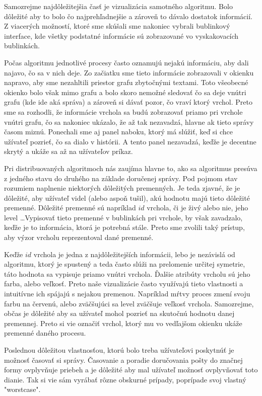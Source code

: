 Samozrejme najdôležitejšia časť je vizualizácia samotného algoritmu. Bolo dôležité aby to bolo čo
najprehľadnejšie a zároveň to dávalo dostatok informácií. Z viacerých možností, ktoré sme skúšali
sme nakoniec vybrali bublinkový interface, kde všetky podstatné informácie sú zobrazované vo
vyskakovacích bublinkách.

Počas algoritmu jednotlivé procesy často oznamujú nejakú informáciu, aby dali najavo, čo sa v nich
deje. Zo začiatku sme tieto informácie zobrazovali v okienku napravo, aby sme nezahltili priestor
grafu zbytočnými textami. Toto všeobecné okienko bolo však mimo grafu a bolo skoro nemožné sledovať
čo sa deje vnútri grafu (kde ide aká správa) a zároveň si dávať pozor, čo vraví ktorý vrchol. Preto
sme sa rozhodli, že informácie vrchola sa budú zobrazovať priamo pri vrchole vnútri grafu, čo sa
nakoniec ukázalo, že až tak nezavadzá, hlavne ak tieto správy časom miznú. Ponechali sme aj
panel naboku, ktorý má slúžiť, keď si chce užívateľ pozrieť, čo sa dialo v histórii. A tento panel
nezavadzá, keďže je decentne skrytý a ukáže sa až na užívateľov príkaz.

Pri distribuovaných algoritmoch nás zaujíma hlavne to, ako sa algoritmus presúva z jedného stavu do
druhého na základe doručenej správy. Pod pojmom stav rozumiem naplnenie niektorých dôležitých
premenných. Je teda zjavné, že je dôležité, aby užívateľ videl (alebo aspoň tušil), akú hodnotu majú
tieto dôležité premenné. Dôležité premenné sú napríklad $id$ vrchola, či je živý alebo nie, jeho
level \dots Vypisovať tieto premenné v bublinkách pri vrchole, by však zavadzalo, keďže je to
informácia, ktorá je potrebná stále. Preto sme zvolili taký prístup, aby výzor vrcholu reprezentoval
dané premenné.

Keďže $id$ vrchola je jedna z najdôležitejších informácii, lebo je nezávislá od algoritmu, ktorý je
spustený a teda často slúži na prelomenie určitej symetrie, táto hodnota sa vypisuje priamo vnútri
vrchola. Ďalšie atribúty vrcholu sú jeho farba, alebo veľkosť. Preto naše vizualizácie často
využívajú tieto vlastnosti a intuitívne ich spájajú s nejakou premenou. Napríklad mŕtvy proces zmení
svoju farbu na červenú, alebo zväčšujúci sa level zväčšuje veľkosť vrchola.
Samozrejme, občas je dôležité aby sa užívateľ mohol pozrieť na skutočnú hodnotu danej premennej.
Preto si vie označiť vrchol, ktorý mu vo vedľajšom okienku ukáže premenné daného procesu.

Poslednou dôležitou vlastnosťou, ktorú bolo treba užívateľovi poskytnúť je možnosť časovať si
správy. Časovanie a poradie doručovania pošty do značnej formy ovplyvňuje priebeh a je dôležité aby
mal užívateľ možnosť ovplyvňovať toto dianie. Tak si vie sám vyrábať rôzne obskurné prípady,
poprípade svoj vlastný "worstcase".

